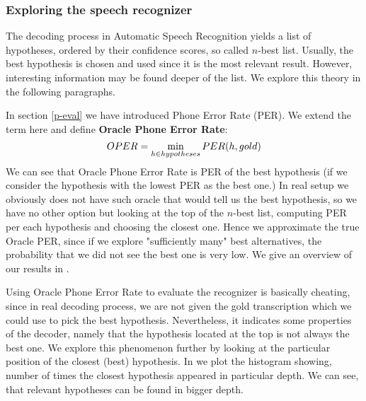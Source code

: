 \subsubsection{Exploring the speech recognizer}
The decoding process in Automatic Speech Recognition yields a list of hypotheses, ordered by their confidence scores, so called $n$-best list.
Usually, the best hypothesis is chosen and used since it is the most relevant result.
However, interesting information may be found deeper of the list.
We explore this theory in the following paragraphs.
\par
In section \ref{p-eval} we have introduced Phone Error Rate (PER).
We extend the term here and define \textbf{Oracle Phone Error Rate}:
\begin{equation}
OPER = \operatorname*{min}_{h \in hypotheses} PER(h, gold)
\end{equation}
We can see that Oracle Phone Error Rate is PER of the best hypothesis (if we consider the hypothesis with the lowest PER as the best one.)
In real setup we obviously does not have such oracle that would tell us the best hypothesis, so we have no other option but looking at the top of the $n$-best list, computing PER per each hypothesis and choosing the closest one.
Hence we approximate the true Oracle PER, since if we explore "sufficiently many" best alternatives, the probability that we did not see the best one is very low.
We give an overview of our results in .
\par
Using Oracle Phone Error Rate to evaluate the recognizer is basically cheating, since in real decoding process, we are not given the gold transcription which we could use to pick the best hypothesis.
Nevertheless, it indicates some properties of the decoder, namely that the hypothesis located at the top is not always the best one.
We explore this phenomenon further by looking at the particular position of the closest (best) hypothesis.
In  we plot the histogram showing, number of times the closest hypothesis appeared in particular depth.
We can see, that relevant hypotheses can be found in bigger depth.

